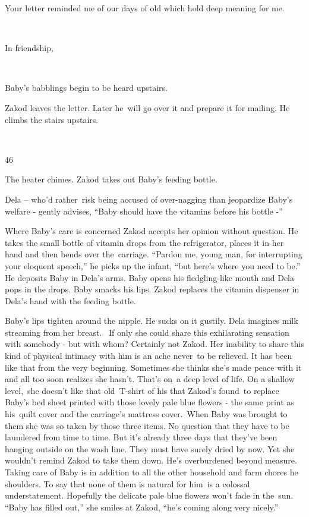 \documentclass[twoside,11pt]{book}
\begin{document}
Your letter reminded me of our days of old which hold deep meaning for me. 

~

In friendship,

~

Baby's babblings begin to be heard upstairs.~~~~~ 

Zakod leaves the letter. Later he~will go over it and prepare it for mailing. He climbs the stairs upstairs.

~

46\ 

The heater chimes. Zakod takes out Baby's feeding bottle. 

Dela -- who'd rather~risk being accused of over-nagging than jeopardize Baby's welfare - gently advises,
``Baby should have the vitamins before his bottle -'' 

Where Baby's care is concerned Zakod accepts her opinion without question. He takes the small bottle of vitamin drops
from the refrigerator, places it in her hand and then bends over the\ carriage. ``Pardon me, young man,
for interrupting your eloquent speech,'' he picks up the infant, ``but here's where you need to
be.'' He deposits Baby in Dela's arms. Baby opens his fledgling-like mouth and Dela pops in the drops.
Baby smacks his lips. Zakod replaces the vitamin dispenser in Dela's hand with the feeding bottle. 

Baby's lips tighten around the nipple. He sucks on it gustily. Dela imagines milk streaming from her breast. \ If only
she could share this exhilarating sensation with somebody - but with whom? Certainly not Zakod. Her inability to share
this kind of physical intimacy with him is an ache never\ to be relieved. It has been like that from the very
beginning. Sometimes she thinks she's made peace with it and all too soon realizes she hasn't. That's on\ a deep level
of life. On a shallow level,\ she doesn't like that old\ T{}-shirt of his that Zakod's found\ to replace Baby's bed
sheet printed with those lovely pale blue flowers - the same print as his\ quilt cover and the carriage's mattress
cover.\ When Baby was brought to them she was so taken by those three items. No question that they have to be laundered
from time to time. But it's already three days that they've been hanging outside on the wash line. They must have
surely dried by now. Yet she wouldn{}'t remind Zakod to take them down. He's overburdened beyond measure. Taking care
of Baby is in addition to all the other household and farm chores he shoulders. To say that none of them is natural for
him~is a colossal understatement. Hopefully the delicate pale blue flowers won't fade in the~sun. ``Baby
has filled out,'' she smiles at Zakod, ``he's coming along very nicely.'' 
\end{document}
